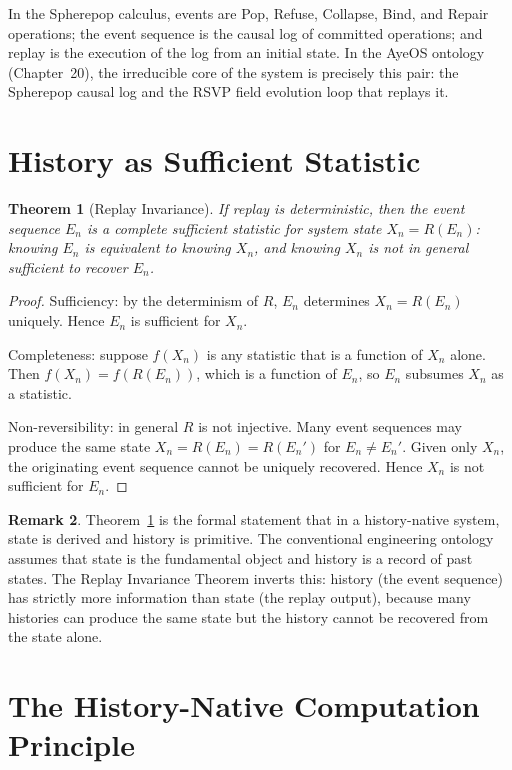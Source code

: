 \documentclass[12pt, oneside]{book}
\theoremstyle{flyxion}
\newtheorem{theorem}{Theorem}[chapter]
\theoremstyle{definition}
\newtheorem{remark}[theorem]{Remark}
\begin{document}
In the Spherepop calculus, events are Pop, Refuse,
Collapse, Bind, and Repair operations; the event sequence
is the causal log of committed operations; and replay
is the execution of the log from an initial state. In
the AyeOS ontology (Chapter~20), the irreducible core
of the system is precisely this pair: the Spherepop causal
log and the RSVP field evolution loop that replays it.

\section{History as Sufficient Statistic}

\begin{theorem}[Replay Invariance]
\label{thm:replay_invariance}
If replay is deterministic, then the event sequence $E_n$
is a complete sufficient statistic for system state $X_n
= R(E_n)$: knowing $E_n$ is equivalent to knowing $X_n$,
and knowing $X_n$ is not in general sufficient to recover
$E_n$.
\end{theorem}

\begin{proof}
Sufficiency: by the determinism of $R$, $E_n$ determines
$X_n = R(E_n)$ uniquely. Hence $E_n$ is sufficient for
$X_n$.

Completeness: suppose $f(X_n)$ is any statistic that is
a function of $X_n$ alone. Then $f(X_n) = f(R(E_n))$,
which is a function of $E_n$, so $E_n$ subsumes $X_n$
as a statistic.

Non-reversibility: in general $R$ is not injective. Many
event sequences may produce the same state $X_n = R(E_n)
= R(E_n')$ for $E_n \neq E_n'$. Given only $X_n$, the
originating event sequence cannot be uniquely recovered.
Hence $X_n$ is not sufficient for $E_n$.
\end{proof}

\begin{remark}
Theorem~\ref{thm:replay_invariance} is the formal statement
that in a history-native system, state is derived and history
is primitive. The conventional engineering ontology assumes
that state is the fundamental object and history is a record
of past states. The Replay Invariance Theorem inverts this:
history (the event sequence) has strictly more information
than state (the replay output), because many histories can
produce the same state but the history cannot be recovered
from the state alone.
\end{remark}

\section{The History-Native Computation Principle}
\end{document}
